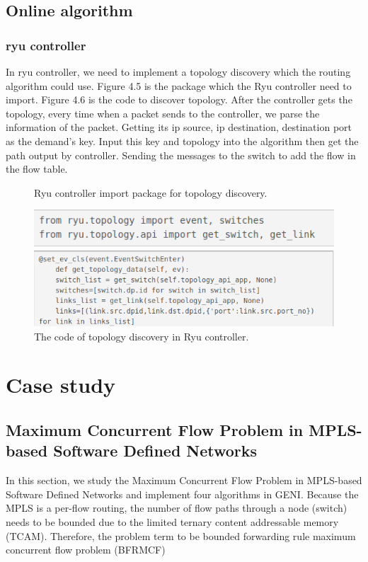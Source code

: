 \documentclass[a4paper,12pt]{report}
\begin{document}
\begin{large}
	 	\section{Online algorithm}
	 		\subsection{ryu controller}
	 		\qquad In ryu controller, we need to implement a topology discovery which the routing algorithm could use. Figure 4.5 is the package which the Ryu controller need to import. Figure 4.6 is the code to discover topology. After the controller gets the topology, every time when a packet sends to the controller, we parse the information of the packet. Getting its ip source, ip destination, destination port as the demand's key. Input this key and topology into the algorithm then get the path output by controller. Sending the messages to the switch to add the flow in the flow table.
	 		\begin{figure}
	          \caption{Ryu controller import package for topology discovery.}
	          \centering
	            \includegraphics[width=1.0\textwidth]{ryu_import.png}
	          \caption{The code of topology discovery in Ryu controller.}
	            \includegraphics[width=1.0\textwidth]{ryu_discovery.png}
	      	\end{figure}
  \chapter{Case study}
  \section{Maximum Concurrent Flow Problem in MPLS-based Software Defined Networks}
    \qquad In this section, we study the Maximum Concurrent Flow Problem in MPLS-based Software Defined Networks and implement four algorithms in GENI. Because the MPLS is a per-flow routing, the number of flow paths through a node (switch) needs to be bounded due to the limited ternary content addressable memory (TCAM). Therefore, the problem term to be bounded forwarding rule maximum concurrent flow problem (BFRMCF)

\end{large}
\end{document}
